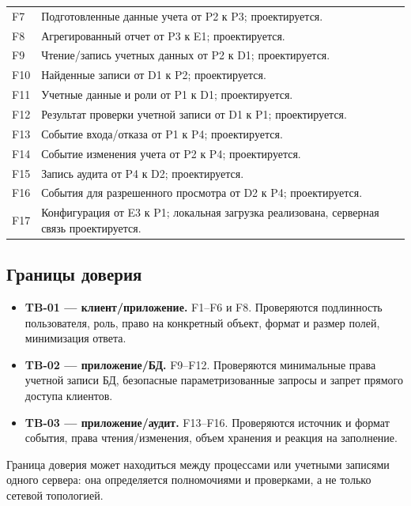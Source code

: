 \documentclass[12pt,a4paper]{article}
\begin{document}
\begin{longtable}{p{1.5cm}p{13.0cm}}
F7 & Подготовленные данные учета от P2 к P3; проектируется.\\
F8 & Агрегированный отчет от P3 к E1; проектируется.\\
F9 & Чтение/запись учетных данных от P2 к D1; проектируется.\\
F10 & Найденные записи от D1 к P2; проектируется.\\
F11 & Учетные данные и роли от P1 к D1; проектируется.\\
F12 & Результат проверки учетной записи от D1 к P1; проектируется.\\
F13 & Событие входа/отказа от P1 к P4; проектируется.\\
F14 & Событие изменения учета от P2 к P4; проектируется.\\
F15 & Запись аудита от P4 к D2; проектируется.\\
F16 & События для разрешенного просмотра от D2 к P4; проектируется.\\
F17 & Конфигурация от E3 к P1; локальная загрузка реализована, серверная связь проектируется.\\
\bottomrule
\end{longtable}

\subsection{Границы доверия}
\begin{itemize}[leftmargin=1.2cm]
\item \textbf{TB-01 — клиент/приложение.} F1–F6 и F8. Проверяются подлинность пользователя, роль, право на конкретный объект, формат и размер полей, минимизация ответа.
\item \textbf{TB-02 — приложение/БД.} F9–F12. Проверяются минимальные права учетной записи БД, безопасные параметризованные запросы и запрет прямого доступа клиентов.
\item \textbf{TB-03 — приложение/аудит.} F13–F16. Проверяются источник и формат события, права чтения/изменения, объем хранения и реакция на заполнение.
\end{itemize}
Граница доверия может находиться между процессами или учетными записями одного сервера: она определяется полномочиями и проверками, а не только сетевой топологией.
\end{document}
